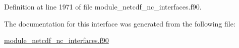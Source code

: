 Definition at line 1971 of file module\+\_\+netcdf\+\_\+nc\+\_\+interfaces.\+f90.



The documentation for this interface was generated from the following file\+:\begin{DoxyCompactItemize}
\item 
\hyperlink{module__netcdf__nc__interfaces_8f90}{module\+\_\+netcdf\+\_\+nc\+\_\+interfaces.\+f90}\end{DoxyCompactItemize}

